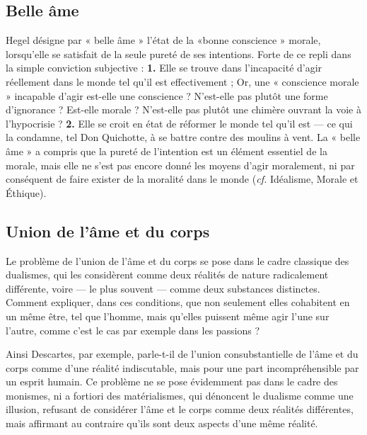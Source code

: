 \subsection{Belle âme}

Hegel désigne par « belle âme » l'état de la «bonne conscience » morale, lorsqu'elle se satisfait de la seule pureté de ses intentions. Forte de ce repli dans la simple conviction subjective : {\bf 1.} Elle se trouve dans l'incapacité d'agir réellement dans le monde tel qu'il est effectivement ; Or, une « conscience morale » incapable d'agir est-elle une conscience ? N'est-elle pas plutôt une forme d'ignorance ? Est-elle morale ? N'est-elle pas plutôt une chimère ouvrant la voie à l'hypocrisie ? {\bf 2.} Elle se croit en état de réformer le monde tel qu'il est — ce qui la condamne, tel Don Quichotte, à se battre contre des moulins à vent. La « belle âme » a compris que la pureté de l'intention est un élément essentiel de la morale, mais elle ne s'est pas encore donné les moyens d'agir moralement, ni par conséquent de faire exister de la moralité dans le monde ({\it cf.} Idéalisme, Morale et Éthique).

\subsection{Union de l'âme et du corps}

Le problème de l'union de l'âme et du corps se pose dans le cadre classique des dualismes, qui les considèrent comme deux réalités de nature radicalement différente, voire — le plus souvent — comme deux substances distinctes. Comment expliquer, dans ces conditions, que non seulement elles cohabitent en un même être, tel que l'homme, mais qu'elles puissent même
agir l'une sur l'autre, comme c'est le cas par exemple dans les passions ?

Ainsi Descartes, par exemple, parle-t-il de l'union consubstantielle de l'âme et du corps comme d'une réalité indiscutable, mais pour une part incompréhensible par un esprit humain. Ce problème ne se pose évidemment pas dans le cadre des monismes, ni a fortiori des matérialismes, qui dénoncent le dualisme comme une illusion, refusant de considérer l'âme et le corps comme deux réalités différentes, mais affirmant au contraire qu'ils sont deux aspects d'une même réalité.
